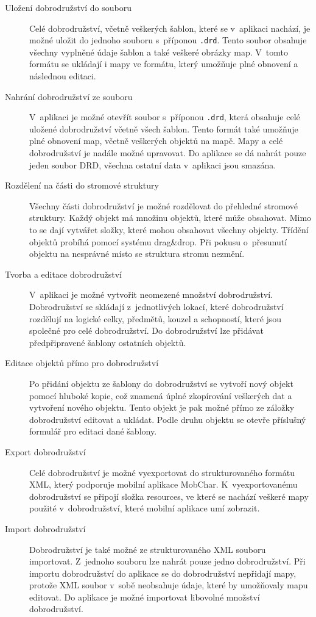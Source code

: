 \documentclass[thesis=B,czech]{resources/FITthesis}[2012/06/26]
\begin{document}
	\begin{description}
		\item[Uložení dobrodružství do souboru]
Celé dobrodružství, včetně veškerých šablon, které se v~aplikaci nachází, je možné uložit do jednoho souboru s~příponou \texttt{.drd}. Tento soubor obsahuje všechny vyplněné údaje šablon a také veškeré obrázky map. V~tomto formátu se ukládají i mapy ve formátu, který umožňuje plné obnovení a následnou editaci. 

		\item[Nahrání dobrodružství ze souboru]
V~aplikaci je možné otevřít soubor s~příponou \texttt{.drd}, která obsahuje celé uložené dobrodružství včetně všech šablon. Tento formát také umožňuje plné obnovení map, včetně veškerých objektů na mapě. Mapy a celé dobrodružství je nadále možné upravovat. Do aplikace se dá nahrát pouze jeden soubor DRD, všechna ostatní data v~aplikaci jsou smazána.
 
		\item[Rozdělení na části do stromové struktury]
		Všechny části dobrodružství je možné rozdělovat do přehledné stromové struktury. Každý objekt má množinu objektů, které může obsahovat. Mimo to se dají vytvářet složky, které mohou obsahovat všechny objekty. Třídění objektů probíhá pomocí systému drag\&drop. Při pokusu o~přesunutí objektu na nesprávné místo se struktura stromu nezmění. 
		
		\item[Tvorba a editace dobrodružství]
V~aplikaci je možné vytvořit neomezené množství dobrodružství. Dobrodružství se skládají z~jednotlivých lokací, které dobrodružství rozdělují na logické celky, předmětů, kouzel a schopností, které jsou společné pro celé dobrodružství. Do dobrodružství lze přidávat předpřipravené šablony ostatních objektů. 

		\item[Editace objektů přímo pro dobrodružství]
Po přidání objektu ze šablony do dobrodružství se vytvoří nový objekt pomocí hluboké kopie, což znamená úplné zkopírování veškerých dat a vytvoření nového objektu. Tento objekt je pak možné přímo ze záložky dobrodružství editovat a ukládat. Podle druhu objektu se otevře příslušný formulář pro editaci dané šablony.

		\item[Export dobrodružství]
		Celé dobrodružství je možné vyexportovat do strukturovaného formátu XML, který podporuje mobilní aplikace MobChar. K~vyexportovanému dobrodružství se připojí složka resources, ve které se nachází veškeré mapy použité v~dobrodružství, které mobilní aplikace umí zobrazit. 
		
		\item[Import dobrodružství]
		Dobrodružství je také možné ze strukturovaného XML souboru importovat. Z~jednoho souboru lze nahrát pouze jedno dobrodružství. Při importu dobrodružství do aplikace se do dobrodružství nepřidají mapy, protože XML soubor v~sobě neobsahuje údaje, které by umožňovaly mapu editovat. Do aplikace je možné importovat libovolné množství dobrodružství.
	\end{description}
	
\end{document}
